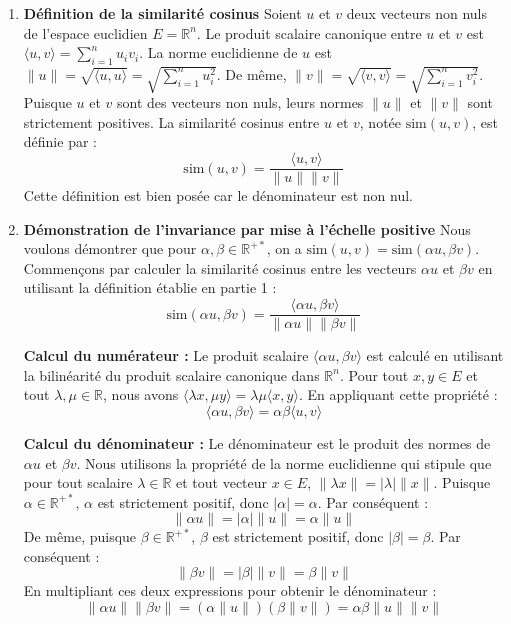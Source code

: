 \documentclass[11pt,a4paper]{report}
\begin{document}
\begin{enumerate}
\def\labelenumi{\arabic{enumi}.}
\item
  \textbf{Définition de la similarité cosinus} Soient \(u\) et \(v\)
  deux vecteurs non nuls de l'espace euclidien \(E = \mathbb{R}^n\). Le
  produit scalaire canonique entre \(u\) et \(v\) est
  \(\langle u, v \rangle = \sum_{i=1}^n u_i v_i\). La norme euclidienne
  de \(u\) est
  \(\|u\| = \sqrt{\langle u, u \rangle} = \sqrt{\sum_{i=1}^n u_i^2}\).
  De même,
  \(\|v\| = \sqrt{\langle v, v \rangle} = \sqrt{\sum_{i=1}^n v_i^2}\).
  Puisque \(u\) et \(v\) sont des vecteurs non nuls, leurs normes
  \(\|u\|\) et \(\|v\|\) sont strictement positives. La similarité
  cosinus entre \(u\) et \(v\), notée \(\text{sim}(u, v)\), est définie
  par :
  \[ \text{sim}(u, v) = \frac{\langle u, v \rangle}{\|u\| \|v\|} \]
  Cette définition est bien posée car le dénominateur est non nul.
\item
  \textbf{Démonstration de l'invariance par mise à l'échelle positive}
  Nous voulons démontrer que pour \(\alpha, \beta \in \mathbb{R}^{+*}\),
  on a \(\text{sim}(u, v) = \text{sim}(\alpha u, \beta v)\). Commençons
  par calculer la similarité cosinus entre les vecteurs \(\alpha u\) et
  \(\beta v\) en utilisant la définition établie en partie 1 :
  \[ \text{sim}(\alpha u, \beta v) = \frac{\langle \alpha u, \beta v \rangle}{\|\alpha u\| \|\beta v\|} \]

  \textbf{Calcul du numérateur :} Le produit scalaire
  \(\langle \alpha u, \beta v \rangle\) est calculé en utilisant la
  bilinéarité du produit scalaire canonique dans \(\mathbb{R}^n\). Pour
  tout \(x, y \in E\) et tout \(\lambda, \mu \in \mathbb{R}\), nous
  avons
  \(\langle \lambda x, \mu y \rangle = \lambda \mu \langle x, y \rangle\).
  En appliquant cette propriété :
  \[ \langle \alpha u, \beta v \rangle = \alpha \beta \langle u, v \rangle \]

  \textbf{Calcul du dénominateur :} Le dénominateur est le produit des
  normes de \(\alpha u\) et \(\beta v\). Nous utilisons la propriété de
  la norme euclidienne qui stipule que pour tout scalaire
  \(\lambda \in \mathbb{R}\) et tout vecteur \(x \in E\),
  \(\| \lambda x \| = |\lambda| \|x\|\). Puisque
  \(\alpha \in \mathbb{R}^{+*}\), \(\alpha\) est strictement positif,
  donc \(|\alpha| = \alpha\). Par conséquent :
  \[ \|\alpha u\| = |\alpha| \|u\| = \alpha \|u\| \] De même, puisque
  \(\beta \in \mathbb{R}^{+*}\), \(\beta\) est strictement positif, donc
  \(|\beta| = \beta\). Par conséquent :
  \[ \|\beta v\| = |\beta| \|v\| = \beta \|v\| \] En multipliant ces
  deux expressions pour obtenir le dénominateur :
  \[ \|\alpha u\| \|\beta v\| = (\alpha \|u\|) (\beta \|v\|) = \alpha \beta \|u\| \|v\| \]


\end{enumerate}
\end{document}
